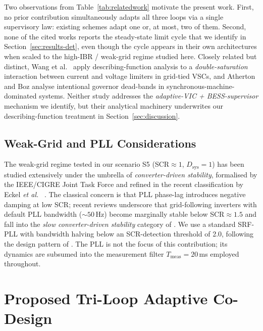 \documentclass[journal]{IEEEtran}
\begin{document}
Two observations from Table~\ref{tab:relatedwork} motivate the
present work. First, no prior contribution simultaneously adapts all
three loops via a single supervisory law: existing schemes adapt one
or, at most, two of them. Second, none of the cited works reports the
steady-state limit cycle that we identify in
Section~\ref{sec:results-det}, even though the cycle appears in their
own architectures when scaled to the high-IBR / weak-grid regime
studied here. Closely related but distinct, Wang et al.\
\cite{wang2022describing} apply describing-function analysis to a
\emph{double-saturation} interaction between current and voltage
limiters in grid-tied VSCs, and Atherton and Boz
\cite{atherton2019deadband} analyse intentional governor dead-bands
in synchronous-machine-dominated systems. Neither study addresses the
\emph{adaptive-VIC + BESS-supervisor} mechanism we identify, but their
analytical machinery underwrites our describing-function treatment in
Section~\ref{sec:discussion}.

\subsection{Weak-Grid and PLL Considerations}
The weak-grid regime tested in our scenario S5 (SCR$\approx 1$,
$D_\mathrm{sys}=1$) has been studied extensively under the umbrella of
\emph{converter-driven stability}, formalised by the IEEE/CIGRE Joint
Task Force \cite{hatziargyriou2021classification} and refined in the
recent classification by Eckel \textit{et al.}~\cite{eckel2024classification}
\cite{sun2011impedance,saleem2024impedance,liu2025frontiers,zhao2025impedance,zhang2024frequency,tsang2025multistability}.
The classical concern is that PLL phase-lag introduces negative
damping at low SCR; recent reviews
\cite{zhang2024frequency,johnson2024large,eckel2024classification}
underscore that grid-following inverters with default PLL bandwidth
($\sim 50$\,Hz) become marginally stable below SCR$\approx 1.5$ and
fall into the \emph{slow converter-driven stability} category of
\cite{hatziargyriou2021classification}. We use a standard
SRF-PLL with bandwidth halving below an SCR-detection threshold of
2.0, following the design pattern of
\cite{rocabert2012control,zhang2024frequency}. The PLL is not the focus
of this contribution; its dynamics are subsumed into the measurement
filter $T_\mathrm{meas}=20\,$ms employed throughout.

\section{Proposed Tri-Loop Adaptive Co-Design}\label{sec:method}
\end{document}
